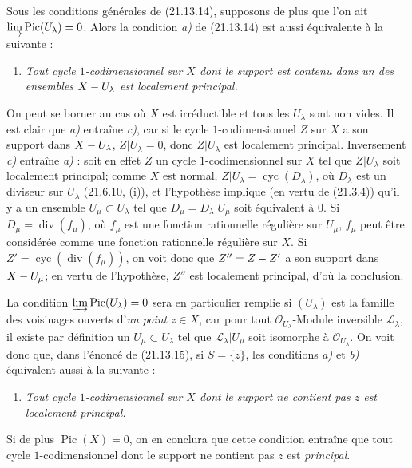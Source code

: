 \begin{remark}[21.13.16]
\label{IV.21.13.16}
Sous les conditions générales de (21.13.14), supposons de plus que l'on ait
$\varinjlim\operatorname{Pic}(U_\lambda)=0$. Alors la condition \emph{a)} de (21.13.14)
est aussi équivalente à la suivante :
\begin{enumerate}
  \item[c)] \emph{Tout cycle $1$-codimensionnel sur $X$ dont le support est contenu
  dans un des ensembles $X- U_\lambda$ est localement principal.}
\end{enumerate}

On peut se borner au cas où $X$ est irréductible et tous les $U_\lambda$ sont non
vides. Il est clair que \emph{a)} entraîne \emph{c)}, car si le cycle $1$-codimensionnel $Z$ sur
$X$ a son support dans $X- U_\lambda$, $Z|U_\lambda=0$, donc $Z|U_\lambda$ est
localement principal. Inversement \emph{c)} entraîne \emph{a)} : soit en effet $Z$ un cycle
$1$-codimensionnel sur $X$ tel que $Z|U_\lambda$ soit localement principal; comme $X$
est normal, $Z|U_\lambda=\operatorname{cyc}(D_\lambda)$, où $D_\lambda$ est un
diviseur sur $U_\lambda$ (21.6.10, (i)), et l'hypothèse implique (en vertu de
(21.3.4)) qu'il y a un ensemble $U_\mu\subset U_\lambda$ tel que
$D_\mu=D_\lambda|U_\mu$ soit équivalent à $0$. Si
$D_\mu=\operatorname{div}(f_\mu)$, où $f_\mu$ est une fonction rationnelle régulière
sur $U_\mu$, $f_\mu$ peut être considérée comme une fonction rationnelle régulière
sur $X$. Si $Z'=\operatorname{cyc}(\operatorname{div}(f_\mu))$, on voit donc que
$Z''=Z- Z'$ a son support dans $X- U_\mu$; en vertu de l'hypothèse, $Z''$ est
localement principal, d'où la conclusion.

La condition $\varinjlim\operatorname{Pic}(U_\lambda)=0$ sera en particulier remplie
si $(U_\lambda)$ est la famille des voisinages ouverts d'\emph{un point} $z\in X$,
car pour tout $\mathcal O_{U_\lambda}$-Module inversible $\mathscr L_\lambda$, il
existe par définition un $U_\mu\subset U_\lambda$ tel que
$\mathscr L_\lambda|U_\mu$ soit isomorphe à $\mathcal O_{U_\lambda}$. On voit donc que,
dans l'énoncé de (21.13.15), si $S=\{z\}$, les conditions \emph{a)} et \emph{b)} équivalent
aussi à la suivante :
\begin{enumerate}
  \item[c)] \emph{Tout cycle $1$-codimensionnel sur $X$ dont le support ne contient
  pas $z$ est localement principal.}
\end{enumerate}

Si de plus $\operatorname{Pic}(X)=0$, on en conclura que cette condition entraîne que
tout cycle $1$-codimensionnel dont le support ne contient pas $z$ est \emph{principal}.
\end{remark}

